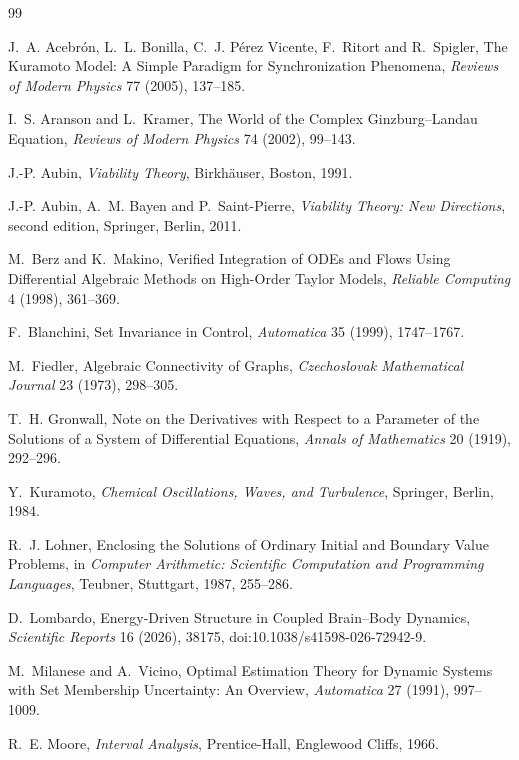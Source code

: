 \documentclass[11pt,notitlepage]{report}
\theoremstyle{definition}
\theoremstyle{remark}
\begin{document}
\begin{thebibliography}{99}

 J.~A. Acebr\'on, L.~L. Bonilla, C.~J. P\'erez Vicente, F.~Ritort and R.~Spigler, The Kuramoto Model: A Simple Paradigm for Synchronization Phenomena, \emph{Reviews of Modern Physics} 77 (2005), 137--185.

 I.~S. Aranson and L.~Kramer, The World of the Complex Ginzburg--Landau Equation, \emph{Reviews of Modern Physics} 74 (2002), 99--143.

 J.-P. Aubin, \emph{Viability Theory}, Birkh\"auser, Boston, 1991.

 J.-P. Aubin, A.~M. Bayen and P.~Saint-Pierre, \emph{Viability Theory: New Directions}, second edition, Springer, Berlin, 2011.

 M.~Berz and K.~Makino, Verified Integration of ODEs and Flows Using Differential Algebraic Methods on High-Order Taylor Models, \emph{Reliable Computing} 4 (1998), 361--369.

 F.~Blanchini, Set Invariance in Control, \emph{Automatica} 35 (1999), 1747--1767.

 M.~Fiedler, Algebraic Connectivity of Graphs, \emph{Czechoslovak Mathematical Journal} 23 (1973), 298--305.

 T.~H. Gronwall, Note on the Derivatives with Respect to a Parameter of the Solutions of a System of Differential Equations, \emph{Annals of Mathematics} 20 (1919), 292--296.

 Y.~Kuramoto, \emph{Chemical Oscillations, Waves, and Turbulence}, Springer, Berlin, 1984.

 R.~J. Lohner, Enclosing the Solutions of Ordinary Initial and Boundary Value Problems, in \emph{Computer Arithmetic: Scientific Computation and Programming Languages}, Teubner, Stuttgart, 1987, 255--286.

 D.~Lombardo, Energy-Driven Structure in Coupled Brain--Body Dynamics, \emph{Scientific Reports} 16 (2026), 38175, doi:10.1038/s41598-026-72942-9.

 M.~Milanese and A.~Vicino, Optimal Estimation Theory for Dynamic Systems with Set Membership Uncertainty: An Overview, \emph{Automatica} 27 (1991), 997--1009.

 R.~E. Moore, \emph{Interval Analysis}, Prentice-Hall, Englewood Cliffs, 1966.


\end{thebibliography}
\end{document}
